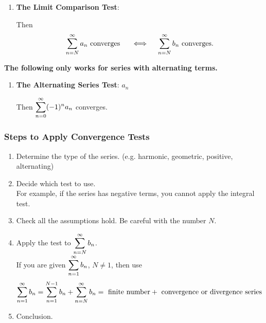 \begin{center}
\begin{tcolorbox}
\begin{enumerate}[resume]
    \item \textbf{The Limit Comparison Test}: 
    
    Then  
    \[\displaystyle\sum_{n=N}^\infty a_n \text{ converges } \quad \iff \quad \displaystyle\sum_{n=N}^\infty b_n \text{ converges}.\]
\end{enumerate}

\textbf{The following only works for series with alternating terms.}
\begin{enumerate}[resume]
    \item \textbf{The Alternating Series Test}: $a_n$ 
        Then $\displaystyle\sum_{n=0}^\infty (-1)^n a_n$ converges.
\end{enumerate}
\end{tcolorbox}
\end{center}

\subsubsection{Steps to Apply Convergence Tests}

\begin{enumerate}
    \item Determine the type of the series. (e.g. harmonic, geometric, positive, alternating)
    \item Decide which test to use. 
    \\
    For example, if the series has negative terms, you cannot apply the integral test.  
    \item Check all the assumptions hold. Be careful with the number $N$. 
    \item Apply the test to $\displaystyle\sum_{n=N}^{\infty} b_n$.
    \\
    If you are given $\displaystyle\sum_{n=1}^{\infty} b_n$, $N \neq 1$, then use
    \[
    \displaystyle\sum_{n=1}^{\infty} b_n = \displaystyle\sum_{n=1}^{N-1} b_n + \displaystyle\sum_{n=N}^{\infty} b_n = \text{ finite number} + \text{ convergence or divergence series}
    \]
    \item Conclusion.
\end{enumerate}

